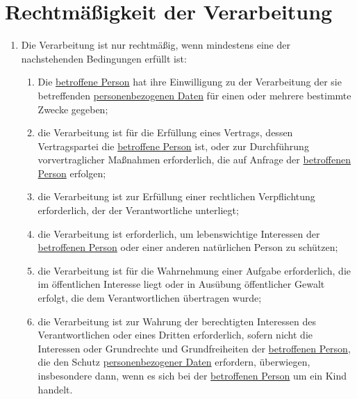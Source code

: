 \chapter{Rechtmäßigkeit der Verarbeitung}
\label{ch:6}


\begin{enumerate}

  \item Die Verarbeitung ist nur rechtmäßig, wenn mindestens eine der nachstehenden Bedingungen erfüllt ist:
  \label{itm:06-1}

  \begin{enumerate}
  
    \item Die \hyperref[itm:04-1]{betroffene Person} hat ihre Einwilligung zu der Verarbeitung der sie betreffenden \hyperref[itm:04-1]{personenbezogenen Daten}
     für einen oder mehrere bestimmte Zwecke gegeben;
    \label{itm:06-1a}

    \item die Verarbeitung ist für die Erfüllung eines Vertrags, dessen Vertragspartei die \hyperref[itm:04-1]{betroffene Person} ist, oder
     zur Durchführung vorvertraglicher Maßnahmen erforderlich, die auf Anfrage der \hyperref[itm:04-1]{betroffenen Person} erfolgen;
    \label{itm:06-1b}

    \item die Verarbeitung ist zur Erfüllung einer rechtlichen Verpflichtung erforderlich, der der Verantwortliche
     unterliegt;
    \label{itm:06-1c}

    \item die Verarbeitung ist erforderlich, um lebenswichtige Interessen der \hyperref[itm:04-1]{betroffenen Person} oder einer anderen
     natürlichen Person zu schützen;
    \label{itm:06-1d}

    \item die Verarbeitung ist für die Wahrnehmung einer Aufgabe erforderlich, die im öffentlichen Interesse liegt oder
     in Ausübung öffentlicher Gewalt erfolgt, die dem Verantwortlichen übertragen wurde;
    \label{itm:06-1e}

    \item die Verarbeitung ist zur Wahrung der berechtigten Interessen des Verantwortlichen oder eines Dritten
     erforderlich, sofern nicht die Interessen oder Grundrechte und Grundfreiheiten der \hyperref[itm:04-1]{betroffenen Person}, die den
     Schutz \hyperref[itm:04-1]{personenbezogener Daten} erfordern, überwiegen, insbesondere dann, wenn es sich bei der \hyperref[itm:04-1]{betroffenen Person}
     um ein Kind handelt.
    \label{itm:06-1f}


\end{enumerate}
\end{enumerate}

